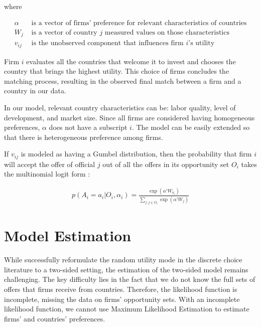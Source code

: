 where

\begin{align*}
\alpha &\text{ is a vector of firms' preference for relevant characteristics of countries} \\
W_j &\text{ is a vector of country $j$ measured values on those characteristics} \\
v_{ij} &\text{ is the unobserved component that influences firm $i$'s utility}
\end{align*}

Firm $i$ evaluates all the countries that welcome it to invest and chooses the country that brings the highest utility. This choice of firms concludes the matching process, resulting in the observed final match between a firm and a country in our data.

In our model, relevant country characteristics can be: labor quality, level of development, and market size. Since all firms are considered having homogeneous preferences, $\alpha$ does not have a subscript $i$. The model can be easily extended so that there is heterogeneous preference among firms.

If $v_{ij}$ is modeled as having a Gumbel distribution, then the probability that firm $i$ will accept the offer of official $j$ out of all the offers in its opportunity set $O_i$ takes the multinomial logit form \citep{Cameron2005}:

\begin{align}
p(A_i = a_i | O_i, \alpha_i) = \frac{\exp(\alpha'W_{a_i})}{\sum\limits_{j:j \in O_i} \exp(\alpha'W_j)} \label{eq:conditional_probability_of_accept}
\end{align}

\section{Model Estimation}
\label{sec:tsl_estimate}

While \citet{Logan1996, Logan1998} successfully reformulate the random utility mode in the discrete choice literature to a two-sided setting, the estimation of the two-sided model remains challenging. The key difficulty lies in the fact that we do not know the full sets of offers that firms receive from countries. Therefore, the likelihood function is incomplete, missing the data on firms' opportunity sets. With an incomplete likelihood function, we cannot use Maximum Likelihood Estimation to estimate firms' and countries' preferences.

